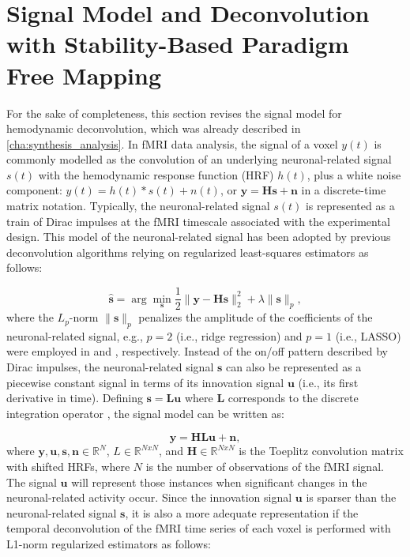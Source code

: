 \section{Signal Model and Deconvolution with Stability-Based Paradigm Free Mapping}
\label{sec:stability_model}
For the sake of completeness, this section revises the signal model for hemodynamic deconvolution, which was already described in \cref{cha:synthesis_analysis}. 
In fMRI data analysis, the signal of a voxel $y(t)$ is commonly modelled as the
convolution of an underlying neuronal-related signal $s(t)$ with the hemodynamic
response function (HRF) $h(t)$, plus a white noise component: $y(t)=
h(t)*s(t)+n(t)$, or $\mathbf{y}=\mathbf{Hs}+\mathbf{n}$ in a discrete-time matrix
notation. Typically, the neuronal-related signal $s(t)$ is represented as a
train of Dirac impulses at the fMRI timescale associated with the experimental
design. This model of the neuronal-related signal has been adopted by previous
deconvolution algorithms
\citep{HernandezGarcia2011Neuronaleventdetection,Gaudes2010Detectioncharacterizationsingle,Gaudes2013Paradigmfreemapping}
relying on regularized least-squares estimators as follows:

\begin{equation}
    \mathbf{\hat{s}} = \arg \min_{\mathbf{s}} \frac{1}{2} \|\mathbf{y} - \mathbf{Hs}\|_2^2 + \lambda \|\mathbf{s}\|_p,
    \label{eq:stability_inverse_problem_spike}
\end{equation}
where the $L_p$-norm $\| \mathbf{s} \|_p$ penalizes the amplitude of the
coefficients of the neuronal-related signal, e.g., $p = 2$ (i.e., ridge
regression) and $p = 1$ (i.e., LASSO) were employed in
\citep{Gaudes2010Detectioncharacterizationsingle} and
\citep{Gaudes2013Paradigmfreemapping}, respectively. Instead of the on/off
pattern described by Dirac impulses, the neuronal-related signal $\mathbf{s}$
can also be represented as a piecewise constant signal in terms of its
innovation signal $\mathbf{u}$ (i.e., its first derivative in time). Defining
$\mathbf{s}=\mathbf{Lu}$ where $\mathbf{L}$ corresponds to the discrete
integration operator \citep{Cherkaoui2019Sparsitybasedblind}, the signal model
can be written as:

\begin{equation}
    \mathbf{y} = \mathbf{HLu} + \mathbf{n},
    \label{eq:stability_signal_model}
\end{equation}
where $\mathbf{y}, \mathbf{u}, \mathbf{s}, \mathbf{n} \in \mathbb{R}^N$, $L \in
\mathbb{R}^{NxN}$, and $\mathbf{H} \in \mathbb{R}^{NxN}$ is the Toeplitz convolution
matrix with shifted HRFs, where $N$ is the number of observations of the fMRI
signal. The signal $\mathbf{u}$ will represent those instances when significant
changes in the neuronal-related activity occur. Since the innovation signal
$\mathbf{u}$ is sparser than the neuronal-related signal $\mathbf{s}$, it is
also a more adequate representation if the temporal deconvolution of the fMRI
time series of each voxel is performed with L1-norm regularized estimators as
follows:

